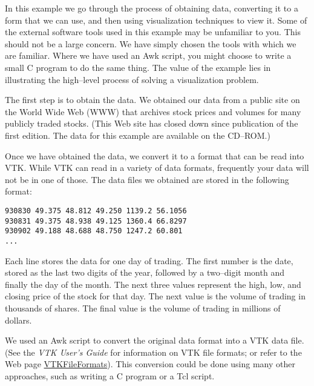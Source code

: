 In this example we go through the process of obtaining data, converting it to a form that we can use, and then using visualization techniques to view it. Some of the external software tools used in this example may be unfamiliar to you. This should not be a large concern. We have simply chosen the tools with which we are familiar. Where we have used an Awk script, you might choose to write a small C program to do the same thing. The value of the example lies in illustrating the high--level process of solving a visualization problem.

The first step is to obtain the data. We obtained our data from a public site on the World Wide Web (WWW) that archives stock prices and volumes for many publicly traded stocks. (This Web site has closed down since publication of the first edition. The data for this example are available on the CD--ROM.)

Once we have obtained the data, we convert it to a format that can be read into VTK. While VTK can read in a variety of data formats, frequently your data will not be in one of those. The data files we obtained are stored in the following format:

\begin{lstlisting}[numbers=none]
930830 49.375 48.812 49.250 1139.2 56.1056
930831 49.375 48.938 49.125 1360.4 66.8297
930902 49.188 48.688 48.750 1247.2 60.801
...
\end{lstlisting}

Each line stores the data for one day of trading. The first number is the date, stored as the last two digits of the year, followed by a two--digit month and finally the day of the month. The next three values represent the high, low, and closing price of the stock for that day. The next value is the volume of trading in thousands of shares. The final value is the volume of trading in millions of dollars.

We used an Awk script to convert the original data format into a VTK data file. (See the \emph{VTK User's Guide} for information on VTK file formats; or refer to the Web page \href{https://lorensen.github.io/VTKExamples/site/VTKFileFormats/}{VTKFileFormats}). This conversion could be done using many other approaches, such as writing a C program or a Tcl script.

